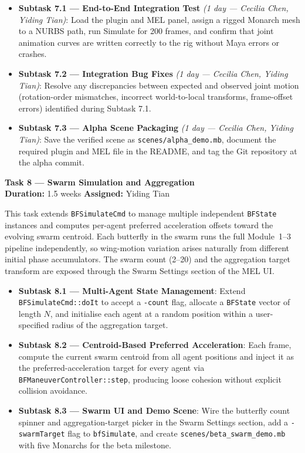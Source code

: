 \documentclass[12pt]{article}
\begin{document}
\begin{itemize}
  \item \textbf{Subtask 7.1 --- End-to-End Integration Test} \textit{(1 day --- Cecilia Chen, Yiding Tian)}: Load the plugin and
    MEL panel, assign a rigged Monarch mesh to a NURBS path, run Simulate for
    200 frames, and confirm that joint animation curves are written correctly to the
    rig without Maya errors or crashes.
  \item \textbf{Subtask 7.2 --- Integration Bug Fixes} \textit{(1 day --- Cecilia Chen, Yiding Tian)}: Resolve any discrepancies
    between expected and observed joint motion (rotation-order mismatches, incorrect
    world-to-local transforms, frame-offset errors) identified during Subtask 7.1.
  \item \textbf{Subtask 7.3 --- Alpha Scene Packaging} \textit{(1 day --- Cecilia Chen, Yiding Tian)}: Save the verified scene as
    \texttt{scenes/alpha\_demo.mb}, document the required plugin and MEL file in the
    README, and tag the Git repository at the alpha commit.
\end{itemize}

\bigskip
\noindent\textbf{Task 8 --- Swarm Simulation and Aggregation}\\
\textbf{Duration:} 1.5 weeks \quad \textbf{Assigned:} Yiding Tian

This task extends \texttt{BFSimulateCmd} to manage multiple independent
\texttt{BFState} instances and computes per-agent preferred acceleration offsets
toward the evolving swarm centroid. Each butterfly in the swarm runs the full
Module~1--3 pipeline independently, so wing-motion variation arises naturally from
different initial phase accumulators. The swarm count (2--20) and the aggregation
target transform are exposed through the Swarm Settings section of the MEL UI.

\begin{itemize}
  \item \textbf{Subtask 8.1 --- Multi-Agent State Management}: Extend
    \texttt{BFSimulateCmd::doIt} to accept a \texttt{-count} flag, allocate a
    \texttt{BFState} vector of length $N$, and initialise each agent at a random
    position within a user-specified radius of the aggregation target.
  \item \textbf{Subtask 8.2 --- Centroid-Based Preferred Acceleration}: Each frame,
    compute the current swarm centroid from all agent positions and inject it as the
    preferred-acceleration target for every agent via
    \texttt{BFManeuverController::step}, producing loose cohesion without explicit
    collision avoidance.
  \item \textbf{Subtask 8.3 --- Swarm UI and Demo Scene}: Wire the butterfly count
    spinner and aggregation-target picker in the Swarm Settings section, add a
    \texttt{-swarmTarget} flag to \texttt{bfSimulate}, and create
    \texttt{scenes/beta\_swarm\_demo.mb} with five Monarchs for the beta milestone.
\end{itemize}
\end{document}
